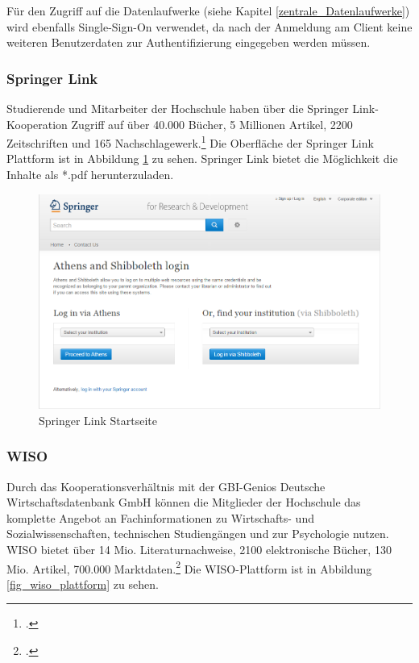 Für den Zugriff auf die Datenlaufwerke (siehe Kapitel \ref{zentrale_Datenlaufwerke}) wird ebenfalls Single-Sign-On verwendet, da nach der Anmeldung am Client keine weiteren Benutzerdaten zur Authentifizierung eingegeben werden müssen. 
\newpage
\subsubsection{Springer Link}
Studierende und Mitarbeiter der Hochschule haben über die Springer Link-Kooperation Zugriff auf über 40.000 Bücher, 5 Millionen Artikel, 2200 Zeitschriften und 165 Nachschlagewerk.\footcite{springer_springerlink_faq_2015} Die Oberfläche der Springer Link Plattform ist in Abbildung \ref{fig_springerlink_startseite} zu sehen. Springer Link bietet die Möglichkeit die Inhalte als *.pdf herunterzuladen. 

\begin{figure}[h]
	\centering
	\includegraphics[width=\textwidth]{kapitel/gruppe2/bilder/springerlink_startseite}
	\caption{Springer Link Startseite \protect\footnotemark}
	\label{fig_springerlink_startseite}
\end{figure}
\clearpage
\subsubsection{WISO}
Durch das Kooperationsverhältnis mit der GBI-Genios Deutsche Wirtschaftsdatenbank GmbH können die Mitglieder der Hochschule das komplette Angebot an Fachinformationen zu Wirtschafts- und Sozialwissenschaften, technischen Studiengängen und zur Psychologie  nutzen. WISO bietet über 14 Mio. Literaturnachweise, 2100 elektronische Bücher, 130 Mio. Artikel, 700.000 Marktdaten.\footcite{gbi_genios_uber_wiso_2015} Die WISO-Plattform ist in Abbildung \ref{fig_wiso_plattform} zu sehen.

